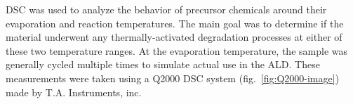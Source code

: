 DSC was used to analyze the behavior of precursor chemicals around their evaporation and reaction temperatures. The main goal was to determine if the material underwent any thermally-activated degradation processes at either of these two temperature ranges. At the evaporation temperature, the sample was generally cycled multiple times to simulate actual use in the ALD. These measurements were taken using a Q2000 DSC system (fig.~\ref{fig:Q2000-image}) made by T.A. Instruments, inc.	
	

































	
	
	